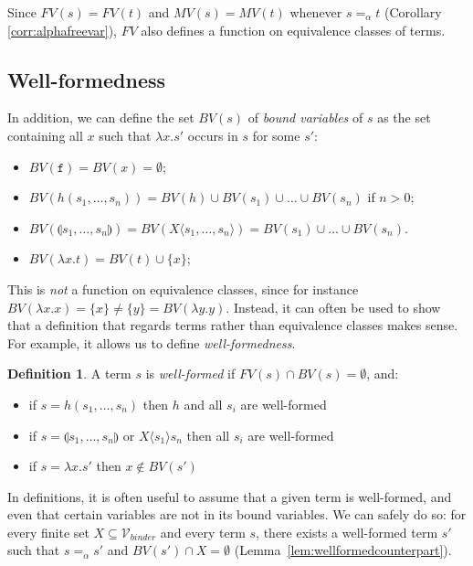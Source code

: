\documentclass{lmcs}
\theoremstyle{theorem}\newtheorem{theorem}{Theorem}
\theoremstyle{theorem}\newtheorem{lemma}[theorem]{Lemma}
\theoremstyle{theorem}\newtheorem{corollary}[theorem]{Corollary}
\theoremstyle{definition}\newtheorem{definition}[theorem]{Definition}
\theoremstyle{definition}\newtheorem{example}[theorem]{Example}
\newcommand{\Vbound}{\mathcal{V}_{\mathit{binder}}}
\newcommand{\FV}{\mathit{FV}}
\newcommand{\FMV}{\mathit{MV}}
\newcommand{\BV}{\mathit{BV}}
\newcommand{\identifier}[1]{\mathtt{#1}}
\newcommand{\afun}{\identifier{f}}
\newcommand{\avar}{x}
\newcommand{\bvar}{y}
\newcommand{\Avar}{X}
\newcommand{\abs}[2]{\lambda #1.#2}
\newcommand{\meta}[2]{#1\langle#2\rangle}
\newcommand{\tuple}[2]{\llparenthesis #1,\dots,#2 \rrparenthesis}
\begin{document}
Since $\FV(s) = \FV(t)$ and $\FMV(s) = \FMV(t)$ whenever $s =_\alpha t$
(Corollary \ref{corr:alphafreevar}), $\FV$ also defines a function on
equivalence classes of terms.

\subsection{Well-formedness}

In addition, we can define the set $\BV(s)$ of \emph{bound variables} of $s$ as
the set containing all $\avar$ such that $\abs{\avar}{s'}$ occurs in $s$ for
some $s'$:

\begin{itemize}
\item $\BV(\afun) = \BV(\avar) = \emptyset$;
\item $\BV(h(s_1,\dots,s_n)) = \BV(h) \cup \BV(s_1) \cup \dots \cup \BV(s_n)$ if
  $n > 0$;
\item $\BV(\tuple{s_1}{s_n}) = \BV(\meta{\Avar}{s_1,\dots,s_n}) =
  \BV(s_1) \cup \dots \cup \BV(s_n)$.
\item $\BV(\abs{\avar}{t}) = \BV(t) \cup \{ \avar \}$;
\end{itemize}

This is \emph{not} a function on equivalence classes, since for
instance $\BV(\abs{\avar}{\avar}) = \{\avar\} \neq \{\bvar\} = \BV(\abs{\bvar}{
\bvar})$.  Instead, it can often be used to show that a definition that regards
terms rather than equivalence classes makes sense.  For example, it allows us to
define \emph{well-formedness}.

\begin{definition}\label{def:wellformed}
A term $s$ is \emph{well-formed} if $\FV(s) \cap \BV(s) = \emptyset$, and:
\begin{itemize}
\item if $s = h(s_1,\dots,s_n)$ then $h$ and all $s_i$ are well-formed
\item if $s = \tuple{s_1}{s_n}$ or $\meta{\Avar}{s_1}{s_n}$ then all $s_i$ are
  well-formed
\item if $s = \abs{\avar}{s'}$ then $\avar \notin \BV(s')$
\end{itemize}
\end{definition}

In definitions, it is often useful to assume that a given term is well-formed,
and even that certain variables are not in its bound variables.  We can safely
do so: for every finite set $X \subseteq \Vbound$ and every term $s$, there
exists a well-formed term $s'$ such that $s =_\alpha s'$ and $\BV(s') \cap
X = \emptyset$ (Lemma~\ref{lem:wellformedcounterpart}).
\end{document}
